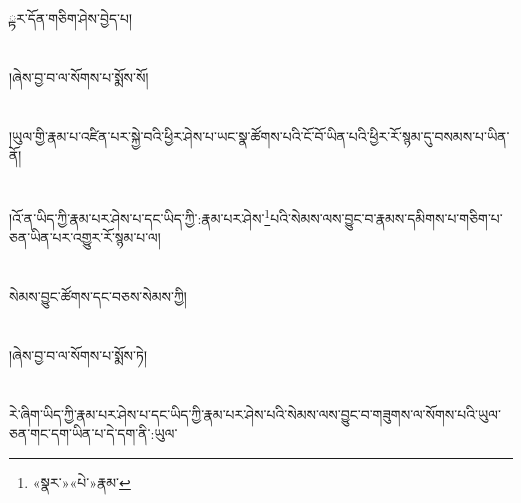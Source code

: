 ྟར་དོན་གཅིག་ཤེས་བྱེད་པ།\chapter{ }།ཞེས་བྱ་བ་ལ་སོགས་པ་སྨོས་སོ།\chapter{ }།ཡུལ་གྱི་རྣམ་པ་འཛིན་པར་སྐྱེ་བའི་ཕྱིར་ཤེས་པ་ཡང་སྣ་ཚོགས་པའི་ངོ་བོ་ཡིན་པའི་ཕྱིར་རོ་སྙམ་དུ་བསམས་པ་ཡིན་ནོ།\chapter{ }།འོ་ན་ཡིད་ཀྱི་རྣམ་པར་ཤེས་པ་དང་ཡིད་ཀྱི་:རྣམ་པར་ཤེས་\footnote{«སྣར་»«པེ་»རྣམ་}པའི་སེམས་ལས་བྱུང་བ་རྣམས་དམིགས་པ་གཅིག་པ་ཅན་ཡིན་པར་འགྱུར་རོ་སྙམ་པ་ལ།\chapter{ }སེམས་བྱུང་ཚོགས་དང་བཅས་སེམས་ཀྱི།\chapter{ }།ཞེས་བྱ་བ་ལ་སོགས་པ་སྨོས་ཏེ།\chapter{ }རེ་ཞིག་ཡིད་ཀྱི་རྣམ་པར་ཤེས་པ་དང་ཡིད་ཀྱི་རྣམ་པར་ཤེས་པའི་སེམས་ལས་བྱུང་བ་གཟུགས་ལ་སོགས་པའི་ཡུལ་ཅན་གང་དག་ཡིན་པ་དེ་དག་ནི་:ཡུལ་